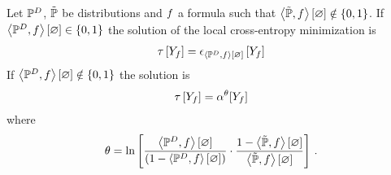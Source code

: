 \begin{lemma}
    \label{lem:localHybridParamUpdate}
    Let $\mathbb{P}^{D}$, $\tilde{\mathbb{P}}$ be distributions and $f$ a formula such that $\left\langle \tilde{\mathbb{P}},f\right\rangle \left[ \varnothing \right]\notin\{0,1\}$.
    If $\left\langle \mathbb{P}^{D},f\right\rangle \left[ \varnothing \right]\in\{0,1\}$ the solution of the local cross-entropy minimization is
    \begin{align*}
        \tau\left[Y_{f}\right] = \epsilon_{\left\langle \mathbb{P}^{D},f\right\rangle \left[ \varnothing \right]}\left[Y_{f}\right]
    \end{align*}
    If $\left\langle \mathbb{P}^{D},f\right\rangle \left[ \varnothing \right]\notin\{0,1\}$ the solution is
    \begin{align*}
        \tau\left[Y_{f}\right] = \alpha^{\theta}[Y_{f}]
    \end{align*}
    where
    \begin{align*}
        \theta = \ln \left[ 
            \frac{\left\langle \mathbb{P}^{D},f\right\rangle \left[ \varnothing \right]}{(1-\left\langle \mathbb{P}^{D},f\right\rangle \left[ \varnothing \right])}
            \cdot \frac{1-\left\langle \tilde{\mathbb{P}},f\right\rangle \left[ \varnothing \right]}{\left\langle \tilde{\mathbb{P}},f\right\rangle \left[ \varnothing \right]}
         \right] \, .
    \end{align*}
\end{lemma}
